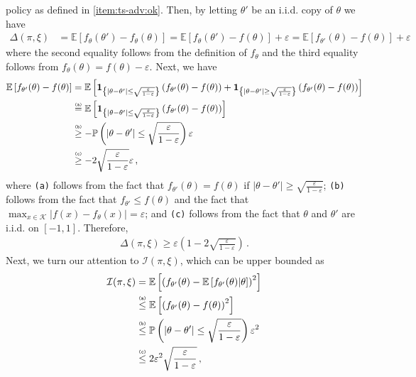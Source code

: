 \documentclass[letter, 12pt]{report}
\newcommand{\explan}[1]{\stackrel{\text{\tiny \texttt{#1}}}}
\newcommand{\paren}[1]{\left( #1 \right)}
\newcommand{\brak}[1]{\left[ #1 \right]}
\newcommand{\E}{\mathbb E}
\newcommand{\cK}{\mathcal K}
\newcommand{\sind}{\bm{1}}
\newcommand{\I}{\mathcal{I}}
\newcommand{\1}{\mathbf{1}}
\renewcommand{\epsilon}{\varepsilon}
\theoremstyle{plain}
\theoremstyle{definition}
\theoremstyle{remark}
\begin{document}
policy as defined in \ref{item:ts-adv:ok}.
Then, by letting $\theta'$ be an i.i.d. copy of $\theta$ we have
\begin{align*}
    \Delta(\pi, \xi)
     & =
    \E\brak{
        f_{\theta}(\theta') - f_\theta(\theta)
    }
    =
    \E\brak{
        f_{\theta}(\theta') - f(\theta)
    } + \epsilon
    =
    \E\brak{
        f_{\theta'}(\theta) - f(\theta)
    } + \epsilon
\end{align*}
where the second equality follows from the definition of $f_\theta$ and the third equality follows from $f_\theta(\theta) = f(\theta) - \epsilon$.
Next, we have
\begin{align*}
    \E\brak{
        f_{\theta'}(\theta) - f(\theta)
    }
     & =
    \E\brak{
        \sind_{
            \left\{
            |\theta - \theta'| \leq \sqrt{\frac{\epsilon}{1-\epsilon}}
            \right\}
        }
        \paren{
            f_{\theta'}(\theta) - f(\theta)
        }
        +
        \sind_{
            \left\{
            |\theta - \theta'| \geq \sqrt{\frac{\epsilon}{1-\epsilon}}
            \right\}
        }
        \paren{
            f_{\theta'}(\theta) - f(\theta)
        }
    }    \\
     &
    \explan{(a)}
    =
    \E\brak{
        \sind_{
            \left\{
            |\theta - \theta'| \leq \sqrt{\frac{\epsilon}{1-\epsilon}}
            \right\}
        }
        \paren{
            f_{\theta'}(\theta) - f(\theta)
        }
    }
    \\
     &
    \explan{(b)}
    \geq
    -
    \mathbb{P}\paren{
        |\theta - \theta'| \leq \sqrt{\frac{\epsilon}{1-\epsilon}}
    }
    \epsilon
    \\
     &
    \explan{(c)}
    \geq
    -
    2 \sqrt{\frac{\epsilon}{1-\epsilon}}
    \epsilon\,,
\end{align*}
where \texttt{(a)} follows from the fact that $f_{\theta'}(\theta) = f(\theta)$
if $|\theta - \theta'| \geq \sqrt{\frac{\epsilon}{1-\epsilon}}$;
\texttt{(b)} follows from the fact that $f_{\theta'} \leq f(\theta)$
and the fact that $\max_{x \in \cK} |f(x) - f_\theta(x)| = \epsilon$;
and \texttt{(c)} follows from the fact that $\theta$ and $\theta'$ are i.i.d. on $[-1,1]$.
Therefore,
\begin{align*}
    \Delta(\pi, \xi)
    \geq
    \epsilon \paren{1 - 2 \sqrt{\frac{\epsilon}{1-\epsilon}}}\,.
\end{align*}
Next, we turn our attention to $\I(\pi, \xi)$, which can be upper bounded as
\begin{align*}
    \I(\pi, \xi)
     & =
    \E\brak{
        \paren{
            f_{\theta'}(\theta) - \E\brak{f_{\theta'}(\theta)|\theta}
        }^2
    }
    \\
     &
    \explan{(a)}
    \leq
    \E\brak{
        \paren{
            f_{\theta'}(\theta) - f(\theta)
        }^2
    }
    \\
     &
    \explan{(b)}
    \leq
    \mathbb{P}\paren{
        |\theta - \theta'| \leq \sqrt{\frac{\epsilon}{1-\epsilon}}
    }
    \epsilon^2
    \\
     &
    \explan{(c)}
    \leq
    2 \epsilon^2\sqrt{\frac{\epsilon}{1-\epsilon}}\,,
\end{align*}
\end{document}
